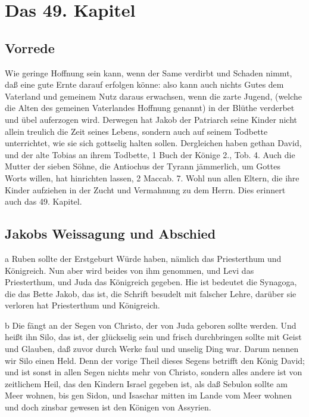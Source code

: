 \chapter{Das 49. Kapitel}

\section{Vorrede}

Wie geringe Hoffnung sein kann, wenn der Same verdirbt und Schaden nimmt, daß eine gute Ernte darauf erfolgen könne: also kann auch nichts Gutes dem Vaterland und gemeinem Nutz daraus erwachsen, wenn die zarte Jugend, (welche die Alten des gemeinen Vaterlandes Hoffnung genannt) in der Blüthe verderbet und übel auferzogen wird. Derwegen hat Jakob der Patriarch seine Kinder nicht allein treulich die Zeit seines Lebens, sondern auch auf seinem Todbette unterrichtet, wie sie sich gottselig halten sollen. Dergleichen haben gethan David, und der alte Tobias an ihrem Todbette, 1 Buch der Könige 2., Tob. 4. Auch die Mutter der sieben Söhne, die Antiochus der Tyrann jämmerlich, um Gottes Worts willen, hat hinrichten lassen, 2 Maccab. 7. Wohl nun allen Eltern, die ihre Kinder aufziehen in der Zucht und Vermahnung zu dem Herrn. Dies erinnert auch das 49. Kapitel.

\section{Jakobs Weissagung und Abschied}

a Ruben sollte der Erstgeburt Würde haben, nämlich das Priesterthum und Königreich. Nun aber wird beides von ihm genommen, und Levi das Priesterthum, und Juda das Königreich gegeben. Hie ist bedeutet die Synagoga, die das Bette Jakob, das ist, die Schrift besudelt mit falscher Lehre, darüber sie verloren hat Priesterthum und Königreich.

b Die fängt an der Segen von Christo, der von Juda geboren sollte werden. Und heißt ihn Silo, das ist, der glückselig sein und frisch durchbringen sollte mit Geist und Glauben, daß zuvor durch Werke faul und unselig Ding war. Darum nennen wir Silo einen Held. Denn der vorige Theil dieses Segens betrifft den König David; und ist sonst in allen Segen nichts mehr von Christo, sondern alles andere ist von zeitlichem Heil, das den Kindern Israel gegeben ist, als daß Sebulon sollte am Meer wohnen, bis gen Sidon, und Isaschar mitten im Lande vom Meer wohnen und doch zinsbar gewesen ist den Königen von Assyrien.

